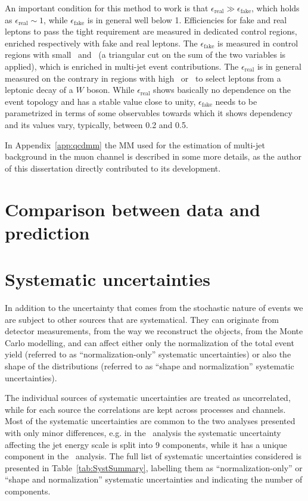 An important condition for this method to work is that 
$\epsilon_\mathrm{real} \gg \epsilon_\mathrm{fake}$, which 
holds as $\epsilon_\mathrm{real}\sim 1$, while $\epsilon_\mathrm{fake}$
is in general well below 1.
Efficiencies for fake and real leptons to pass the 
tight requirement are measured in dedicated control regions, 
enriched respectively with fake and real leptons.
The $\epsilon_\mathrm{fake}$ is measured in control regions
with small \met\ and \mtw\ (a triangular cut on the
sum of the two variables is applied), which is
enriched in multi-jet event contributions.
The $\epsilon_\mathrm{real}$ is in general measured 
on the contrary in regions with high \met\ or \mtw\
to select leptons from a leptonic decay of a $W$
boson.
While $\epsilon_\mathrm{real}$ shows basically
no dependence on the event topology and has
a stable value close to unity,  $\epsilon_\mathrm{fake}$ 
needs to be parametrized in terms of some observables
towards which it shows dependency and its values
vary, typically, between 0.2 and 0.5.

In Appendix~\ref{app:qcdmm} the MM used for the estimation
of multi-jet background in the muon channel is
described in some more details, as the author of this dissertation
directly contributed to its development.


\section{Comparison between data and prediction}\label{sec:datamcpresel}




\section{Systematic uncertainties}\label{sec:systematics}

In addition to the uncertainty that comes from the stochastic nature
of events we are subject to other sources that are systematical. 
They can originate from
detector measurements, from the way we reconstruct the objects, from the Monte
Carlo modelling, and can affect either only the normalization of the total event
yield (referred to as ``normalization-only'' systematic uncertainties) or also the shape 
of the distributions (referred to as ``shape and normalization'' systematic uncertainties).

The individual sources of systematic uncertainties are treated as uncorrelated, while
for each source the correlations are 
kept across processes and channels. Most of the systematic uncertainties
are common to the two analyses presented with only minor differences, e.g. in the
\htx\  analysis the systematic uncertainty affecting the jet energy scale is
split into 9 components, while it has a unique component in the \wbx\  analysis. 
The full list of systematic uncertainties considered is presented in 
Table~\ref{tab:SystSummary}, labelling them as  ``normalization-only'' 
or ``shape and normalization'' systematic uncertainties and indicating the number of components.

